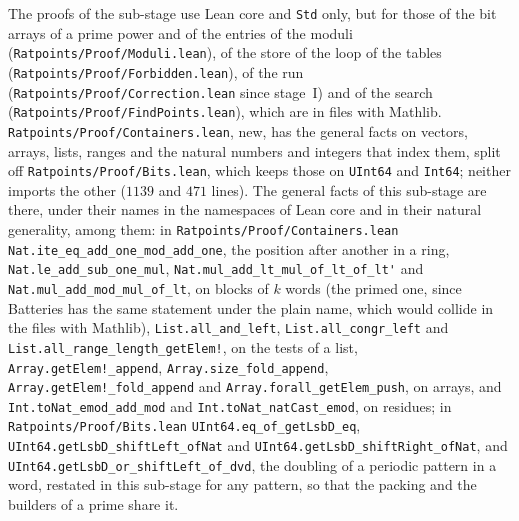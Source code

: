 The proofs of the sub-stage use Lean core and \verb|Std| only, but for those of the bit arrays of a
prime power and of the entries of the moduli (\verb|Ratpoints/Proof/Moduli.lean|), of the store of
the loop of the tables (\verb|Ratpoints/Proof/Forbidden.lean|), of the run
(\verb|Ratpoints/Proof/Correction.lean| since stage~I) and of the search
(\verb|Ratpoints/Proof/FindPoints.lean|), which are in files with Mathlib.
\verb|Ratpoints/Proof/Containers.lean|, new, has the general facts on vectors, arrays, lists, ranges
and the natural numbers and integers that index them, split off \verb|Ratpoints/Proof/Bits.lean|,
which keeps those on \verb|UInt64| and \verb|Int64|; neither imports the other ($1139$ and $471$
lines). The general facts of this sub-stage are there, under their names in the namespaces of Lean
core and in their natural generality, among them: in \verb|Ratpoints/Proof/Containers.lean|
\verb|Nat.ite_eq_add_one_mod_add_one|, the position after another in a ring,
\verb|Nat.le_add_sub_one_mul|, \verb|Nat.mul_add_lt_mul_of_lt_of_lt'| and
\verb|Nat.mul_add_mod_mul_of_lt|, on blocks of $k$ words (the primed one, since Batteries has the
same statement under the plain name, which would collide in the files with Mathlib),
\verb|List.all_and_left|, \verb|List.all_congr_left| and \verb|List.all_range_length_getElem!|, on
the tests of a list, \verb|Array.getElem!_append|, \verb|Array.size_fold_append|,
\verb|Array.getElem!_fold_append| and \verb|Array.forall_getElem_push|, on arrays, and
\verb|Int.toNat_emod_add_mod| and \verb|Int.toNat_natCast_emod|, on residues; in
\verb|Ratpoints/Proof/Bits.lean| \verb|UInt64.eq_of_getLsbD_eq|,
\verb|UInt64.getLsbD_shiftLeft_ofNat| and \verb|UInt64.getLsbD_shiftRight_ofNat|, and
\verb|UInt64.getLsbD_or_shiftLeft_of_dvd|, the doubling of a periodic pattern in a word, restated in
this sub-stage for any pattern, so that the packing and the builders of a prime share it.

